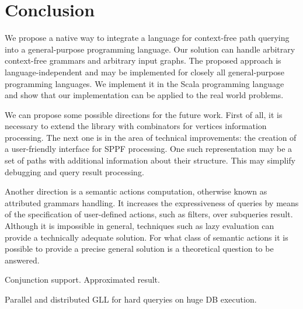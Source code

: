 \section{Conclusion}

We propose a native way to integrate a language for context-free path querying into a general-purpose programming language.
Our solution can handle arbitrary context-free grammars and arbitrary input graphs.
The proposed approach is language-independent and may be implemented for closely all general-purpose programming languages.
We implement it in the Scala programming language and show that our implementation can be applied to the real world problems.

We can propose some possible directions for the future work.
First of all, it is necessary to extend the library with combinators for vertices information processing.
The next one is in the area of technical improvements: the creation of a user-friendly interface for SPPF processing.
One such representation may be a set of paths with additional information about their structure.
This may simplify debugging and query result processing.

Another direction is a semantic actions computation, otherwise known as attributed grammars handling.
It increases the expressiveness of queries by means of the specification of user-defined actions, such as filters, over subqueries result. 
Although it is impossible in general, techniques such as lazy evaluation can provide a technically adequate solution.
For what class of semantic actions it is possible to provide a precise general solution is a theoretical question to be answered. 

Conjunction support. Approximated result.

Parallel and distributed GLL for hard queryies on huge DB execution.